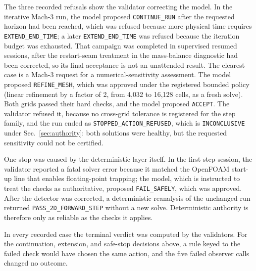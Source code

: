 \documentclass[11pt]{article}
\begin{document}
The three recorded refusals show the validator correcting the model. In the
iterative Mach-3 run, the model proposed \texttt{CONTINUE\_RUN} after the
requested horizon had been reached, which was refused because more physical
time requires \texttt{EXTEND\_END\_TIME}; a later \texttt{EXTEND\_END\_TIME}
was refused because the iteration budget was exhausted. That campaign was
completed in supervised resumed sessions, after the restart-seam treatment in
the mass-balance diagnostic had been corrected, so its final acceptance is not
an unattended result. The clearest case is a Mach-3 request for a
numerical-sensitivity assessment. The model proposed \texttt{REFINE\_MESH},
which was approved under the registered bounded policy (linear refinement by a
factor of 2, from 4,032 to 16,128 cells, as a fresh solve). Both grids passed
their hard checks, and the model proposed \texttt{ACCEPT}. The validator
refused it, because no cross-grid tolerance is registered for the step family,
and the run ended as \texttt{STOPPED\_ACTION\_REFUSED}, which is
\texttt{INCONCLUSIVE} under Sec.~\ref{sec:authority}: both solutions were
healthy, but the requested sensitivity could not be certified.

One stop was caused by the deterministic layer itself. In the first step
session, the validator reported a fatal solver error because it matched the
OpenFOAM start-up line that enables floating-point trapping; the model, which
is instructed to treat the checks as authoritative, proposed
\texttt{FAIL\_SAFELY}, which was approved. After the detector was corrected, a
deterministic reanalysis of the unchanged run returned
\texttt{PASS\_2D\_FORWARD\_STEP} without a new solve. Deterministic authority
is therefore only as reliable as the checks it applies.

In every recorded case the terminal verdict was computed by the validators.
For the continuation, extension, and safe-stop decisions above, a rule keyed to
the failed check would have chosen the same action, and the five failed
observer calls changed no outcome.
\end{document}
